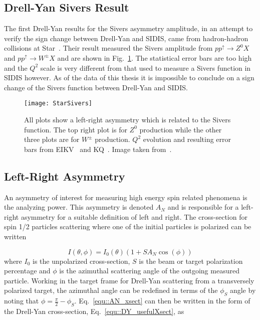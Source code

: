 \subsection{Drell-Yan Sivers Result}
The first Drell-Yan results for the Sivers asymmetry amplitude, in an attempt to
verify the sign change between Drell-Yan and SIDIS, came from hadron-hadron
collisions at Star~\cite{PhysRevLett.116.132301}.  Their result measured the
Sivers amplitude from $pp^{\uparrow} \rightarrow Z^0X$ and $pp^{\uparrow}
\rightarrow W^{\pm}X$ and are shown in Fig.~\ref{fig::StarSivers}.  The
statistical error bars are too high and the $Q^2$ scale is very different from
that used to measure a Sivers function in SIDIS however.  As of the data of this
thesis it is impossible to conclude on a sign change of the Sivers function
between Drell-Yan and SIDIS.

\begin{figure}[h!t]
  \centering
  \texttt{[image: StarSivers]}
  \caption{All plots show a left-right asymmetry which is related to the Sivers
    function.  The top right plot is for $Z^0$ production while the other three
    plots are for $W^\pm$ production.  $Q^2$ evolution and resulting error bars
    from EIKV~\cite{PhysRevD.89.074013} and KQ~\cite{PhysRevLett.103.172001}.
    Image taken from~\cite{PhysRevLett.116.132301}.}
  \label{fig::StarSivers}
\end{figure}

\subsection{Left-Right Asymmetry} \label{sec::lr_theory}
An asymmetry of interest for measuring high energy spin related phenomena is the
analyzing power.  This asymmetry is denoted $A_N$ and is responsible for a
left-right asymmetry for a suitable definition of left and right.  The
cross-section for spin 1/2 particles scattering where one of the initial
particles is polarized can be written

\begin{equation}
  \label{equ::AN_xsect}
  I(\theta, \phi) = I_0(\theta)(1+SA_N \cos(\phi))
\end{equation}
\noindent
where $I_0$ is the unpolarized cross-section, $S$ is the beam or target
polarization percentage and $\phi$ is the azimuthal scattering angle of the
outgoing measured particle.  Working in the target frame for Drell-Yan
scattering from a transversely polarized target, the azimuthal angle can be
redefined in terms of the $\phi_S$ angle by noting that $\phi = \frac{\pi}{2} -
\phi_S$. Eq.~\ref{equ::AN_xsect} can then be written in the form of the
Drell-Yan cross-section, Eq.~\ref{equ::DY_usefulXsect}, as

